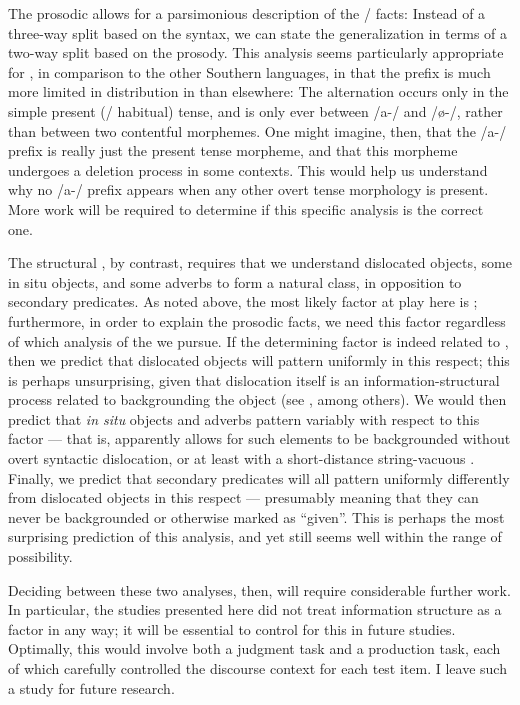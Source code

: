 \documentclass[output=paper,modfonts,nonflat,draftmode]{langsci/langscibook}
\begin{document}
The prosodic  allows for a parsimonious description of the
 \slash {} facts: Instead of a three-way split based on the
syntax, we can state the generalization in terms of a two-way split based on
the prosody. This analysis seems particularly appropriate for , in
comparison to the other Southern  languages, in that the  prefix
is much more limited in distribution in  than elsewhere: The
alternation occurs only in the simple present (/ habitual) tense, and is only
ever between /a-/ and /\o-/, rather than between two contentful morphemes. One
might imagine, then, that the  /a-/ prefix is really just the present
tense morpheme, and that this morpheme undergoes a deletion process in some
contexts. This would help us understand why no /a-/ prefix appears when any
other overt tense morphology is present. More work will be required to
determine if this specific analysis is the correct one.

The structural , by contrast, requires that we understand
dislocated objects, some in situ objects, and some adverbs to form a
natural class, in opposition to secondary predicates. As noted above, the most
likely factor at play here is ; furthermore, in order to
explain the prosodic facts, we need this factor regardless of which analysis of
the  we pursue. If the determining factor is indeed related to
, then we predict that dislocated objects will pattern
uniformly in this respect; this is perhaps unsurprising, given that dislocation
itself is an information-structural process related to backgrounding the object
(see \citealt{Buell2005}, among others). We would then predict that \textit{in
situ} objects and adverbs pattern variably with respect to this factor --- that
is,  apparently allows for such elements to be backgrounded without
overt syntactic dislocation, or at least with a short-distance string-vacuous
. Finally, we predict that secondary predicates will all pattern
uniformly differently from dislocated objects in this respect --- presumably
meaning that they can never be backgrounded or otherwise marked as ``given''.
This is perhaps the most surprising prediction of this analysis, and yet still
seems well within the range of possibility.

Deciding between these two analyses, then, will require considerable further
work. In particular, the studies presented here did not treat information
structure as a factor in any way; it will be essential to control for
this in future studies. Optimally, this would involve both a judgment task and
a production task, each of which carefully controlled the discourse context for
each test item. I leave such a study for future research.
\end{document}

